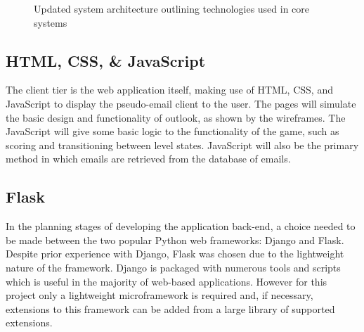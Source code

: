 \documentclass{l4proj}
\begin{document}
\begin{figure}[H]
    \centering
    \caption{Updated system architecture outlining technologies used in core systems}
    \label{fig:tech_arch} 
\end{figure}

\subsection{HTML, CSS, & JavaScript}
The client tier is the web application itself, making use of HTML, CSS, and JavaScript to display the pseudo-email client to the user. The pages will simulate the basic design and functionality of outlook, as shown by the wireframes. The JavaScript will give some basic logic to the functionality of the game, such as scoring and transitioning between level states. JavaScript will also be the primary method in which emails are retrieved from the database of emails.

\subsection{Flask}
In the planning stages of developing the application back-end, a choice needed to be made between the two popular Python web frameworks: Django and Flask. Despite prior experience with Django, Flask was chosen due to the lightweight nature of the framework. Django is packaged with numerous tools and scripts which is useful in the majority of web-based applications. However for this project only a lightweight microframework is required and, if necessary, extensions to this framework can be added from a large library of supported extensions. 
\end{document}
